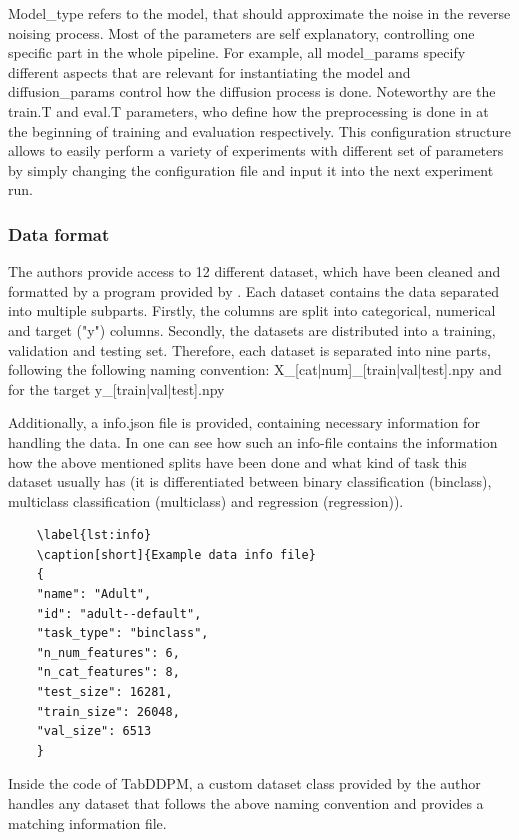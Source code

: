 Model\_type refers to the model, that should approximate the noise in the reverse noising process.
Most of the parameters are self explanatory, controlling one specific part in the whole pipeline.
For example, all model\_params specify different aspects that are relevant for instantiating the model and diffusion\_params control how the diffusion process is done.
Noteworthy are the train.T and eval.T parameters, who define how the preprocessing is done in at the beginning of training and evaluation respectively.
This configuration structure allows to easily perform a variety of experiments with different set of parameters by simply changing the configuration file and input it into the next experiment run.

\subsubsection[]{Data format}
\label{sec:data_format}
The authors provide access to 12 different dataset, which have been cleaned and formatted by a program provided by \cite[]{gorishniy2023EmbeddingsNumericalFeatures}.
Each dataset contains the data separated into multiple subparts.
Firstly, the columns are split into categorical, numerical and target ("y") columns.
Secondly, the datasets are distributed into a training, validation and testing set.
Therefore, each dataset is separated into nine parts, following the following naming convention:
X\_[cat|num]\_[train|val|test].npy and for the target y\_[train|val|test].npy

Additionally, a info.json file is provided, containing necessary information for handling the data.
In  one can see how such an info-file contains the information how the above mentioned splits have been done and what kind of task this dataset usually has (it is differentiated between binary classification (binclass), multiclass classification (multiclass) and regression (regression)).
\begin{lstlisting}
    \label{lst:info}
    \caption[short]{Example data info file}
    {
    "name": "Adult",
    "id": "adult--default",
    "task_type": "binclass",
    "n_num_features": 6,
    "n_cat_features": 8,
    "test_size": 16281,
    "train_size": 26048,
    "val_size": 6513
    }
\end{lstlisting}
Inside the code of TabDDPM, a custom dataset class provided by the author handles any dataset that follows the above naming convention and provides a matching information file.






